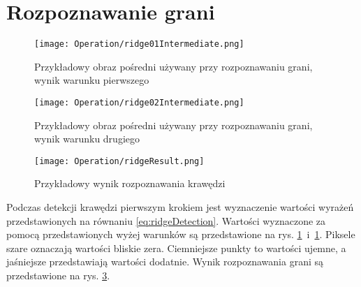 \section{Rozpoznawanie grani}
\label{sec:dzialanieRidge}

\begin{figure}[h]
\begin{center}
\texttt{[image: Operation/ridge01Intermediate.png]}
\end{center}
\caption{Przykładowy obraz pośredni używany przy rozpoznawaniu grani, wynik warunku pierwszego}
\label{fig:ridgeIntermediate1}
\end{figure}

\begin{figure}[h]
\begin{center}
\texttt{[image: Operation/ridge02Intermediate.png]}
\end{center}
\caption{Przykładowy obraz pośredni używany przy rozpoznawaniu grani, wynik warunku drugiego}
\label{fig:ridgeIntermediate2}
\end{figure}

\begin{figure}[h]
\begin{center}
\texttt{[image: Operation/ridgeResult.png]}
\end{center}
\caption{Przykładowy wynik rozpoznawania krawędzi}
\label{fig:ridgeResult}
\end{figure}

Podczas detekcji krawędzi pierwszym krokiem jest wyznaczenie wartości wyrażeń przedstawionych na równaniu \eqref{eq:ridgeDetection}. Wartości wyznaczone za pomocą przedstawionych wyżej warunków są przedstawione na rys. \ref{fig:ridgeIntermediate1}~i~\ref{fig:ridgeIntermediate1}. Piksele szare oznaczają wartości bliskie zera. Ciemniejsze punkty to wartości ujemne, a jaśniejsze przedstawiają wartości dodatnie. Wynik rozpoznawania grani są przedstawione na rys. \ref{fig:ridgeResult}.
